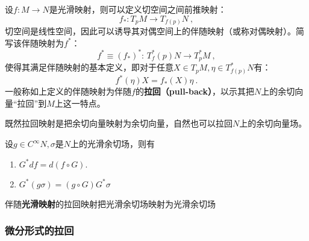 
\begin{issues}
\issueDraft
\end{issues}

设$f:M\rightarrow N$是光滑映射，则可以定义切空间之间前推映射：
\begin{equation}
f_*: T_p M\rightarrow T_{f(p)}N~,
\end{equation}
切空间是线性空间，因此可以诱导其对偶空间上的伴随映射（或称对偶映射）。简写该伴随映射为$f^*$：
\begin{equation}
f^*\equiv(f_*)^*:\,T^*_f(p)N\rightarrow T_p^*M~,
\end{equation}
使得其满足伴随映射的基本定义，即对于任意$X\in T_p M,\eta\in T^*_{f(p)}N$有：
\begin{equation}
f^*(\eta)X=f_*(X)\eta~.
\end{equation}
一般称如上定义的伴随映射为伴随$f$的\textbf{拉回（pull-back）}，以示其把$N$上的余切向量“拉回”到$M$上这一特点。

既然拉回映射是把余切向量映射为余切向量，自然也可以拉回$N$上的余切向量场。
\begin{lemma}{}
设$g\in C^{\infty }N,\sigma$是$N$上的光滑余切场，则有
\begin{enumerate}
\item $G^*df=d(f\circ G).$
\item $G^*(g\sigma)=(g\circ G)G^*\sigma$
\end{enumerate}
\end{lemma}
\begin{theorem}{}
伴随\textbf{光滑映射}的拉回映射把光滑余切场映射为光滑余切场
\end{theorem}
\subsubsection{微分形式的拉回}